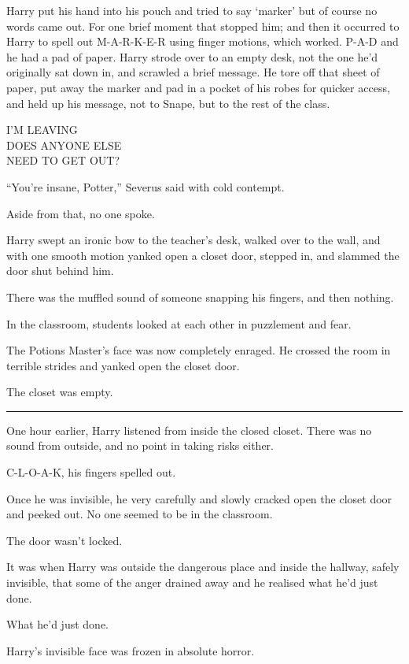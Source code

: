 Harry put his hand into his pouch and tried to say `marker' but of
course no words came out. For one brief moment that stopped him; and
then it occurred to Harry to spell out M-A-R-K-E-R using finger motions,
which worked. P-A-D and he had a pad of paper. Harry strode over to an
empty desk, not the one he'd originally sat down in, and scrawled a
brief message. He tore off that sheet of paper, put away the marker and
pad in a pocket of his robes for quicker access, and held up his
message, not to Snape, but to the rest of the class.

I'M LEAVING\\DOES ANYONE ELSE\\NEED TO GET OUT?

``You're insane, Potter,'' Severus said with cold contempt.

Aside from that, no one spoke.

Harry swept an ironic bow to the teacher's desk, walked over to the
wall, and with one smooth motion yanked open a closet door, stepped in,
and slammed the door shut behind him.

There was the muffled sound of someone snapping his fingers, and then
nothing.

In the classroom, students looked at each other in puzzlement and fear.

The Potions Master's face was now completely enraged. He crossed the
room in terrible strides and yanked open the closet door.

The closet was empty.

\begin{center}\rule{3in}{0.4pt}\end{center}

One hour earlier, Harry listened from inside the closed closet. There
was no sound from outside, and no point in taking risks either.

C-L-O-A-K, his fingers spelled out.

Once he was invisible, he very carefully and slowly cracked open the
closet door and peeked out. No one seemed to be in the classroom.

The door wasn't locked.

It was when Harry was outside the dangerous place and inside the
hallway, safely invisible, that some of the anger drained away and he
realised what he'd just done.

What he'd just done.

Harry's invisible face was frozen in absolute horror.

